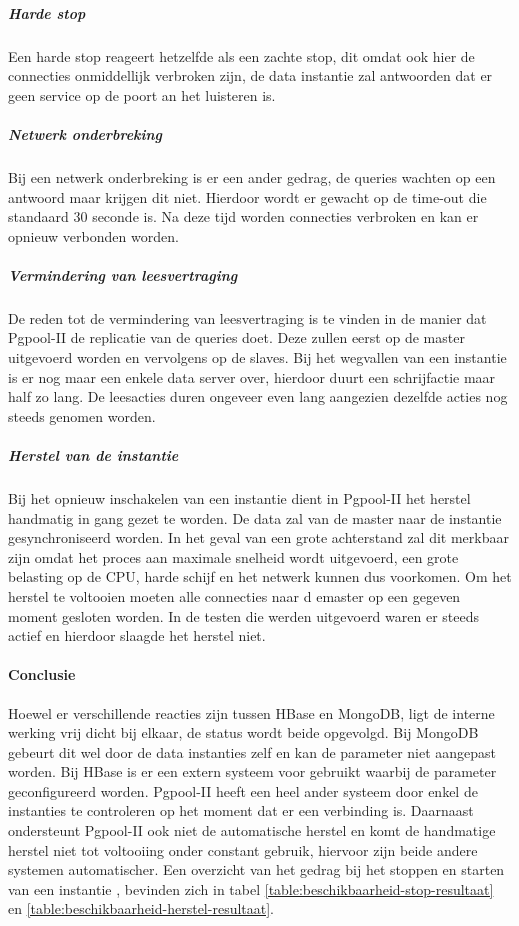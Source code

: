\subparagraph{Harde stop} Een harde stop reageert hetzelfde als een zachte stop, dit omdat ook hier de connecties onmiddellijk verbroken zijn, de data instantie zal antwoorden dat er geen service op de poort an het luisteren is. 

\subparagraph{Netwerk onderbreking} Bij een netwerk onderbreking is er een ander gedrag, de queries wachten op een antwoord maar krijgen dit niet. Hierdoor wordt er gewacht op de time-out die standaard 30 seconde is. Na deze tijd worden connecties verbroken en kan er opnieuw verbonden worden. \\

\subparagraph{Vermindering van leesvertraging} De reden tot de vermindering van leesvertraging is te vinden in de manier dat Pgpool-II de replicatie van de queries doet. Deze zullen eerst op de master uitgevoerd worden en vervolgens op de slaves. Bij het wegvallen van een instantie is er nog maar een enkele data server over, hierdoor duurt een schrijfactie maar half zo lang. De leesacties duren ongeveer even lang aangezien dezelfde acties nog steeds genomen worden. 

\subparagraph{Herstel van de instantie} Bij het opnieuw inschakelen van een instantie dient in Pgpool-II het herstel handmatig in gang gezet te worden. De data zal van de master naar de instantie gesynchroniseerd worden. In het geval van een grote achterstand zal dit merkbaar zijn omdat het proces aan maximale snelheid wordt uitgevoerd, een grote belasting op de CPU, harde schijf en het netwerk kunnen dus voorkomen. Om het herstel te voltooien moeten alle connecties naar d emaster op een gegeven moment gesloten worden. In de testen die werden uitgevoerd waren er steeds actief en hierdoor slaagde het herstel niet. 

\paragraph{Conclusie} Hoewel er verschillende reacties zijn tussen HBase en MongoDB, ligt de interne werking vrij dicht bij elkaar, de status wordt beide opgevolgd. Bij MongoDB gebeurt dit wel door de data instanties zelf en kan de parameter niet aangepast worden. Bij HBase is er een extern systeem voor gebruikt waarbij de parameter geconfigureerd worden. Pgpool-II heeft een heel ander systeem door enkel de instanties te controleren op het moment dat er een verbinding is. 
Daarnaast ondersteunt Pgpool-II ook niet de automatische herstel en komt de handmatige herstel niet tot voltooiing onder constant gebruik, hiervoor zijn beide andere systemen automatischer. Een overzicht van het gedrag bij het stoppen en starten van een instantie , bevinden zich in tabel \ref{table:beschikbaarheid-stop-resultaat} en \ref{table:beschikbaarheid-herstel-resultaat}.

